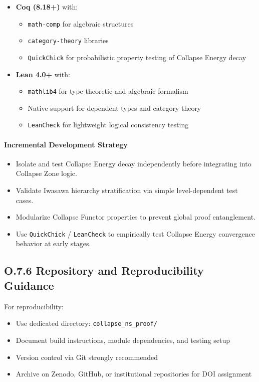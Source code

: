 \documentclass[11pt]{article}
\begin{document}
\begin{itemize}
  \item \textbf{Coq (8.18+)} with:
  \begin{itemize}
    \item \texttt{math-comp} for algebraic structures
    \item \texttt{category-theory} libraries
    \item \texttt{QuickChick} for probabilistic property testing of Collapse Energy decay
  \end{itemize}
  
  \item \textbf{Lean 4.0+} with:
  \begin{itemize}
    \item \texttt{mathlib4} for type-theoretic and algebraic formalism
    \item Native support for dependent types and category theory
    \item \texttt{LeanCheck} for lightweight logical consistency testing
  \end{itemize}
\end{itemize}

\paragraph{Incremental Development Strategy}

\begin{itemize}
  \item Isolate and test Collapse Energy decay independently before integrating into Collapse Zone logic.
  \item Validate Iwasawa hierarchy stratification via simple level-dependent test cases.
  \item Modularize Collapse Functor properties to prevent global proof entanglement.
  \item Use \texttt{QuickChick} / \texttt{LeanCheck} to empirically test Collapse Energy convergence behavior at early stages.
\end{itemize}

\subsection*{O.7.6 Repository and Reproducibility Guidance}

For reproducibility:

\begin{itemize}
  \item Use dedicated directory: \texttt{collapse\_ns\_proof/}
  \item Document build instructions, module dependencies, and testing setup
  \item Version control via Git strongly recommended
  \item Archive on Zenodo, GitHub, or institutional repositories for DOI assignment
\end{itemize}
\end{document}
